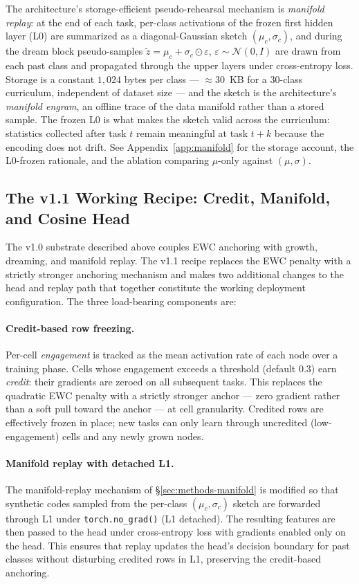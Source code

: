 \documentclass[11pt]{article}
\begin{document}
The architecture's storage-efficient pseudo-rehearsal mechanism is
\emph{manifold replay}: at the end of each task, per-class
activations of the frozen first hidden layer (L0) are summarized as a
diagonal-Gaussian sketch $(\mu_c, \sigma_c)$, and during the dream
block pseudo-samples
$\tilde z = \mu_c + \sigma_c \odot \varepsilon$,
$\varepsilon \sim \mathcal{N}(0, I)$ are drawn from each past class
and propagated through the upper layers under cross-entropy loss.
Storage is a constant $1{,}024$ bytes per class --- $\approx 30$~KB
for a 30-class curriculum, independent of dataset size --- and the
sketch is the architecture's \emph{manifold engram}, an offline trace
of the data manifold rather than a stored sample. The frozen L0 is
what makes the sketch valid across the curriculum: statistics
collected after task $t$ remain meaningful at task $t+k$ because the
encoding does not drift. See Appendix~\ref{app:manifold} for the
storage account, the L0-frozen rationale, and the ablation comparing
$\mu$-only against $(\mu, \sigma)$.

\subsection{The v1.1 Working Recipe: Credit, Manifold, and Cosine Head}
\label{sec:methods-v11}

The v1.0 substrate described above couples EWC anchoring with
growth, dreaming, and manifold replay. The v1.1 recipe replaces
the EWC penalty with a strictly stronger anchoring mechanism and
makes two additional changes to the head and replay path that
together constitute the working deployment configuration. The
three load-bearing components are:

\paragraph{Credit-based row freezing.}
Per-cell \emph{engagement} is tracked as the mean activation rate
of each node over a training phase. Cells whose engagement exceeds
a threshold (default $0.3$) earn \emph{credit}: their gradients
are zeroed on all subsequent tasks. This replaces the quadratic
EWC penalty with a strictly stronger anchor --- zero gradient
rather than a soft pull toward the anchor --- at cell granularity.
Credited rows are effectively frozen in place; new tasks can only
learn through uncredited (low-engagement) cells and any newly
grown nodes.

\paragraph{Manifold replay with detached L1.}
The manifold-replay mechanism of \S\ref{sec:methods-manifold} is
modified so that synthetic codes sampled from the per-class
$(\mu_c, \sigma_c)$ sketch are forwarded through L1 under
\texttt{torch.no\_grad()} (L1 detached). The resulting features
are then passed to the head under cross-entropy loss with
gradients enabled only on the head. This ensures that replay
updates the head's decision boundary for past classes without
disturbing credited rows in L1, preserving the credit-based
anchoring.
\end{document}
